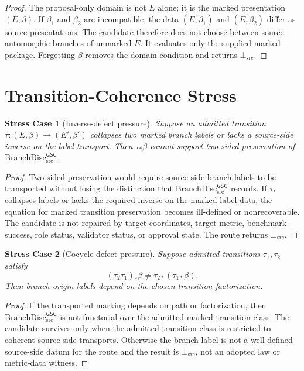 \documentclass[11pt]{article}
\newcommand{\BottomSrc}{\bot_{\mathrm{src}}}
\newcommand{\BranchDisc}{\mathrm{BranchDisc}_{\mathrm{src}}^{\mathsf{GSC}}}
\newtheorem{stresscase}{Stress Case}
\begin{document}
\begin{proof}
The proposal-only domain is not \(E\) alone; it is the marked presentation
\((E,\beta)\). If \(\beta_1\) and \(\beta_2\) are incompatible, the data
\((E,\beta_1)\) and \((E,\beta_2)\) differ as source presentations. The
candidate therefore does not choose between source-automorphic branches of
unmarked \(E\). It evaluates only the supplied marked package. Forgetting
\(\beta\) removes the domain condition and returns \(\BottomSrc\).
\end{proof}

\section{Transition-Coherence Stress}

\begin{stresscase}[Inverse-defect pressure]
Suppose an admitted transition \(\tau:(E,\beta)\to(E',\beta')\) collapses two
marked branch labels or lacks a source-side inverse on the label transport.
Then \(\tau_\ast\beta\) cannot support two-sided preservation of
\(\BranchDisc\).
\end{stresscase}

\begin{proof}
Two-sided preservation would require source-side branch labels to be
transported without losing the distinction that \(\BranchDisc\) records. If
\(\tau_\ast\) collapses labels or lacks the required inverse on the marked
label data, the equation for marked transition preservation becomes
ill-defined or nonrecoverable. The candidate is not repaired by target
coordinates, target metric, benchmark success, role status, validator status,
or approval state. The route returns \(\BottomSrc\).
\end{proof}

\begin{stresscase}[Cocycle-defect pressure]
Suppose admitted transitions \(\tau_1,\tau_2\) satisfy
\[
  (\tau_2\tau_1)_\ast\beta\ne \tau_{2\ast}(\tau_{1\ast}\beta).
\]
Then branch-origin labels depend on the chosen transition factorization.
\end{stresscase}

\begin{proof}
If the transported marking depends on path or factorization, then
\(\BranchDisc\) is not functorial over the admitted marked transition class.
The candidate survives only when the admitted transition class is restricted
to coherent source-side transports. Otherwise the branch label is not a
well-defined source-side datum for the route and the result is
\(\BottomSrc\), not an adopted law or metric-data witness.
\end{proof}
\end{document}
